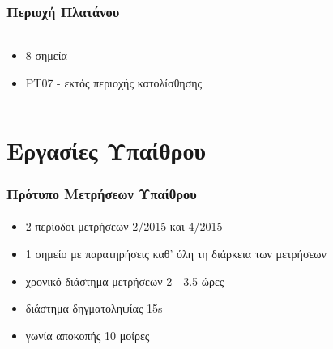 \documentclass{beamer}
\begin{document}
\begin{frame}\frametitle{Περιοχή Πλατάνου}\framesubtitle{}
\begin{columns}[T] %
\begin{column}{.3\textwidth}
\begin{itemize}
	 \item 8 σημεία
	 \item PT07 - εκτός περιοχής κατολίσθησης
\end{itemize}
\end{column}

\end{columns}
\end{frame}
% 

\section{Εργασίες Υπαίθρου}

\begin{frame}\frametitle{Πρότυπο Μετρήσεων Υπαίθρου}\framesubtitle{}
\begin{itemize}
	\item 2 περίοδοι μετρήσεων 2/2015 και 4/2015
	\item 1 σημείο με παρατηρήσεις καθ' όλη τη διάρκεια των μετρήσεων
	\item χρονικό διάστημα μετρήσεων 2 - 3.5 ώρες
	\item διάστημα δηγματοληψίας 15s
	\item γωνία αποκοπής  10 μοίρες
\end{itemize}
\end{frame}
\end{document}
